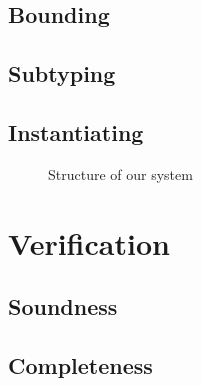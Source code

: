 \documentclass{llncs}
\begin{document}
\subsection{Bounding}
\subsection{Subtyping}
\subsection{Instantiating}

\begin{figure}

\label{fig:cons}
\caption{Structure of our system}
\end{figure}
\begin{figure}

\end{figure}
\begin{figure}

\end{figure}
\begin{figure}

\end{figure}
\begin{figure}

\end{figure}
\begin{figure}

\end{figure}


\section{Verification}
\subsection{Soundness}
\subsection{Completeness}
\end{document}
